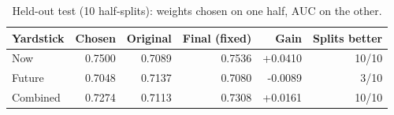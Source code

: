 \begin{table}[htbp]
\centering
\small
\caption{Held-out test (10 half-splits): weights chosen on one half, AUC on the other.}
\label{tab:heldout}
\begin{tabular}{lrrrrr}
\toprule
Yardstick & Chosen & Original & Final (fixed) & Gain & Splits better \\
\midrule
Now & 0.7500 & 0.7089 & 0.7536 & +0.0410 & 10/10 \\
Future & 0.7048 & 0.7137 & 0.7080 & -0.0089 & 3/10 \\
Combined & 0.7274 & 0.7113 & 0.7308 & +0.0161 & 10/10 \\
\bottomrule
\end{tabular}
\end{table}
